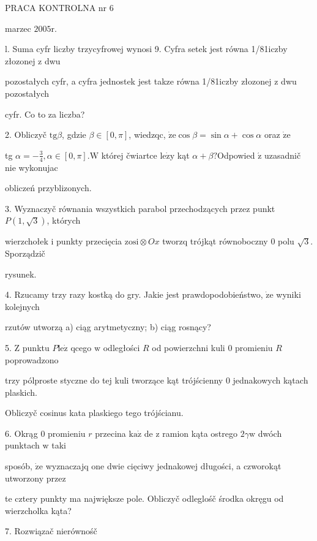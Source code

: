 \documentclass[a4paper,12pt]{article}
\begin{document}
PRACA KONTROLNA nr 6

marzec $2005\mathrm{r}.$

l. Suma cyfr liczby trzycyfrowej wynosi 9. Cyfra setek jest równa 1/81iczby złozonej $\mathrm{z}$ dwu

pozostałych cyfr, a cyfra jednostek jest takze równa 1/81iczby złozonej $\mathrm{z}$ dwu pozostałych

cyfr. Co to za liczba?

2. Obliczyč $\mathrm{t}\mathrm{g}\beta$, gdzie $\beta\in[0,\pi]$, wiedzqc, $\dot{\mathrm{z}}\mathrm{e}\cos\beta=\sin\alpha+\cos\alpha$ oraz $\dot{\mathrm{z}}\mathrm{e}$

tg $\displaystyle \alpha=-\frac{3}{4}, \alpha\in[0,\pi]. \mathrm{W}$ której čwiartce $\mathrm{l}\mathrm{e}\dot{\mathrm{z}}\mathrm{y}$ kąt $\alpha+\beta?$Odpowied $\acute{\mathrm{z}}$ uzasadnič nie wykonujac

obliczeń przyblizonych.

3. Wyznaczyč równania wszystkich parabol przechodzących przez punkt $P(1,\sqrt{3})$, których

wierzchołek $\mathrm{i}$ punkty przecięcia $\mathrm{z}\mathrm{o}\mathrm{s}\mathrm{i}\otimes Ox$ tworzq trójkąt równoboczny $0$ polu $\sqrt{3}$. Sporządzič

rysunek.

4. Rzucamy trzy razy kostką do gry. Jakie jest prawdopodobieństwo, $\dot{\mathrm{z}}\mathrm{e}$ wyniki kolejnych

rzutów utworzą a) ciąg arytmetyczny; b) ciąg rosnący?

5. $\mathrm{Z}$ punktu $P \mathrm{l}\mathrm{e}\dot{\mathrm{z}}$ qcego $\mathrm{w}$ odległości $R$ od powierzchni kuli $0$ promieniu $R$ poprowadzono

trzy pólproste styczne do tej kuli tworzące kąt trójścienny $0$ jednakowych kątach plaskich.

Obliczyč cosinus kata plaskiego tego trójścianu.

6. Okrąg $0$ promieniu $r$ przecina $\mathrm{k}\mathrm{a}\dot{\mathrm{z}}$ de $\mathrm{z}$ ramion kąta ostrego $2\gamma \mathrm{w}$ dwóch punktach $\mathrm{w}$ taki

sposób, $\dot{\mathrm{z}}\mathrm{e}$ wyznaczajq one dwie cięciwy jednakowej długości, a czworokąt utworzony przez

te cztery punkty ma największe pole. Obliczyč odleglośč środka okręgu od wierzcholka kąta?

7. Rozwiązač nierównośč
\end{document}
